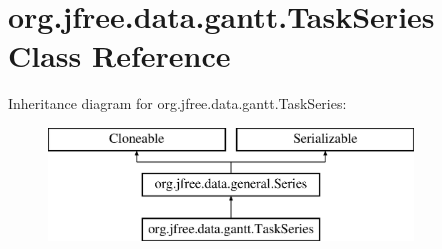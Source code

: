 \hypertarget{classorg_1_1jfree_1_1data_1_1gantt_1_1_task_series}{}\section{org.\+jfree.\+data.\+gantt.\+Task\+Series Class Reference}
\label{classorg_1_1jfree_1_1data_1_1gantt_1_1_task_series}
Inheritance diagram for org.\+jfree.\+data.\+gantt.\+Task\+Series\+:\begin{figure}[H]
\begin{center}
\leavevmode
\includegraphics[height=3.000000cm]{classorg_1_1jfree_1_1data_1_1gantt_1_1_task_series}
\end{center}
\end{figure}
